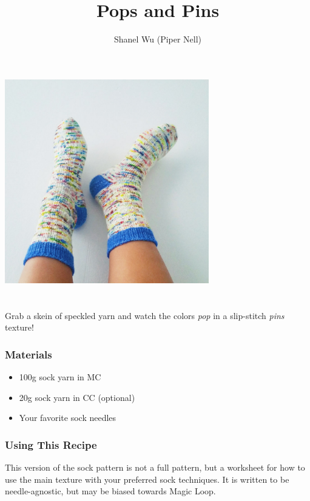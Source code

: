 \documentclass[12pt]{article}
\title{Pops and Pins}
\author{Shanel Wu (Piper Nell)}
\begin{document}
\begin{titlingpage}

\begin{multicols}{2}
\includegraphics[height=3.5in]{feetWall.jpg}

\section*{\thetitle}
\vspace{-0.5em}
\subsubsection*{\theauthor}

Grab a skein of speckled yarn and watch the colors \emph{pop} in a slip-stitch \emph{pins} texture!

\vspace{-1em}
\subsubsection*{Materials}

\begin{itemize}
\item 100g sock yarn in MC
\item 20g sock yarn in CC (optional)
\item Your favorite sock needles
\end{itemize}

\subsubsection*{Using This Recipe}

This version of the sock pattern is not a full pattern, but a worksheet for how to use the main texture with your preferred sock techniques. It is written to be needle-agnostic, but may be biased towards Magic Loop. 


\end{multicols}
\end{titlingpage}
\end{document}
